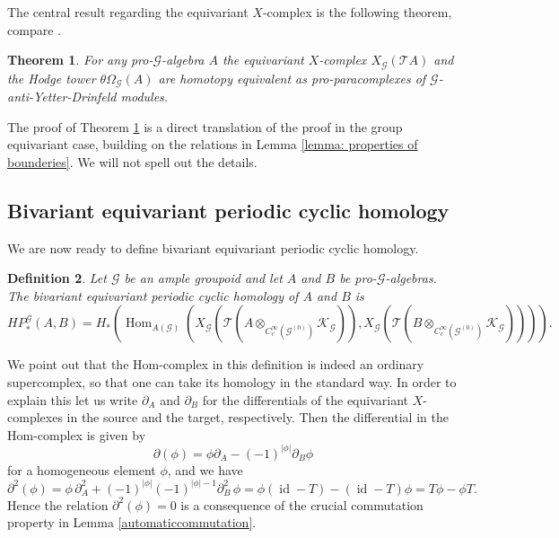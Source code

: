 \documentclass{amsart}
\newtheorem{thm}{Theorem}[section]
\newtheorem{dfn}[thm]{Definition}
\newcommand{\G}{\mathcal{G}}
\newcommand{\K}{\mathcal{K}}
\newcommand{\T}{\mathcal{T}}
\newcommand{\ccinfty}{C_c^\infty}
\DeclareMathOperator{\id}{id}
\DeclareMathOperator{\Hom}{Hom}
\begin{document}
The central result regarding the equivariant $ X $-complex 
is the following theorem, compare \cite[Theorem 8.6]{VOIGT_equivariantperiodiccyclichomology}. 

\begin{thm} \label{homotopyeq} 
For any pro-$ \G $-algebra $ A $ the equivariant $ X $-complex $ X_\G(\T A) $ and the Hodge tower $ \theta\Omega_\G(A) $ are homotopy equivalent as pro-paracomplexes of $ \G $-anti-Yetter-Drinfeld modules. 
\end{thm}

The proof of Theorem \ref{homotopyeq} is a direct translation of the proof in the group equivariant case, building on the relations in Lemma \ref{lemma: properties of bounderies}. We will not spell out the details. 

\subsection{Bivariant equivariant periodic cyclic homology}

We are now ready to define bivariant equivariant periodic cyclic homology. 

\begin{dfn} \label{defhpg}
Let $ \G $ be an ample groupoid and let $ A $ and $ B $ be pro-$ \G $-algebras. The bivariant equivariant periodic cyclic homology of $ A $ and $ B $ is 
$$
HP_*^\G(A,B) = H_*(\Hom_{A(\G)}(X_\G(\T(A \otimes_{\ccinfty(\G^{(0)})} \K_\G)), X_\G( \T (B\otimes_{\ccinfty(\G^{(0)})} \K_\G)))).
$$
\end{dfn}

We point out that the Hom-complex in this definition is indeed an ordinary supercomplex, so that one can take its homology in the standard way. In order to explain this let us write $ \partial_A $ and $ \partial_B $ for the differentials of the equivariant $ X $-complexes in the source and the target, respectively. Then the differential in the Hom-complex is given by 
\begin{equation*}
\partial(\phi) = \phi \partial_A - (-1)^{|\phi|} \partial_B \phi
\end{equation*}
for a homogeneous element $ \phi $, and  we have
\begin{equation*}
\partial^2(\phi) =
\phi\, \partial_A^2 + (-1)^{|\phi|} (-1)^{|\phi| - 1} \partial_B^2\,\phi 
= \phi(\id - T) - (\id - T)\phi = T \phi - \phi T. 
\end{equation*}
Hence the relation $ \partial^2(\phi) = 0 $ is a consequence of the crucial commutation property in Lemma \ref{automaticcommutation}.
\end{document}
